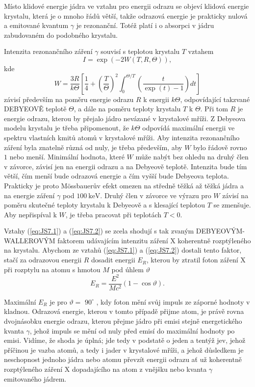 \documentclass[../../main.tex]{subfiles}
\begin{document}
Místo klidové energie jádra ve vztahu pro energii odrazu se objeví klidová energie krystalu, která je o mnoho řádů větší, takže odrazová energie je prakticky nulová a emitované kvantum $\gamma$ je rezonanční. Totéž platí i o absorpci v jádru zabudovaném do podobného krystalu. 

Intenzita rezonančního záření $\gamma$ souvisí s teplotou krystalu $T$ vztahem 
\begin{equation}\label{eq:JS7.1}
I = \exp (-2W(T,R, \Theta)),
\end{equation}
kde 
\begin{equation}\label{eq:JS7.2}
W = \dfrac{3R}{k \Theta} \left[ \dfrac{1}{4} + \left( \dfrac{T}{\Theta} \right)^2 \int_{0}^{\Theta /T} \left( \dfrac{t}{\exp(t) - 1}\right) dt \right] 
\end{equation}
závisí především na poměru energie odrazu $R$ k energii $k \Theta$, odpovídající takzvané DEBYEOVĚ teplotě $\Theta$, a dále na poměru teploty krystalu $T$ k $\Theta$. Při tom $R$ je energie odrazu, kterou by přejalo jádro nevázané v krystalové mříži. Z Debyeova modelu krystalu je třeba připomenout, že $k \Theta $ odpovídá maximální energii ve spektru vlastních kmitů atomů v krystalové mříži. Aby intenzita rezonančního záření byla znatelně různá od nuly, je třeba především, aby $W$ bylo řádově rovno $1$ nebo menší. Minimální hodnota, které $W$ může nabýt bez ohledu na druhý člen v závorce, závisí jen na energii odrazu a na Debyeově
teplotě. Intenzita bude tím větší, čím menší bude odrazová energie a čím vyšší bude Debyeova teplota. Prakticky je proto Mössbauerův efekt omezen na středně těžká až těžká jádra a na energie záření $\gamma$ pod $100 ~\mathrm{keV}$. Druhý člen v závorce ve výrazu pro $W$ závisí na poměru skutečné teploty krystalu k Debyeově a s klesající teplotou $T$ se zmenšuje. Aby nepřispíval k $W$, je třeba pracovat při teplotách $T < 0$.

Vztahy (\ref{eq:JS7.1}) a (\ref{eq:JS7.2}) se zcela shodují s tak zvaným DEBYEOVÝM-WALLEROVÝM faktorem udávajícím intenzitu záření X koherentně rozptýleného na krystalu. Abychom ze vztahů (\ref{eq:JS7.1}) a (\ref{eq:JS7.2}) dostali tento faktor, stačí za odrazovou energii $R$ dosadit energii $E_R$, kterou by ztratil foton záření X při rozptylu na atomu s hmotou $M$ pod úhlem $\vartheta$
\begin{equation}
E_R = \dfrac{E^2}{Mc^2} (1 - \cos \vartheta).
\end{equation}

Maximální $E_R$ je pro $\vartheta =$ $90^{\circ}$ , kdy foton mění svůj impuls ze záporné hodnoty v kladnou. Odrazová energie, kterou v tomto případě přijme atom, je právě rovna dvojnásobku energie odrazu, kterou přejme jádro při emisi stejně energetického kvanta $\gamma$, jehož impuls se mění od nuly před emisí do maximální hodnoty po emisi. Vidíme, že shoda je úplná; jde tedy v podstatě o jeden a tentýž jev, jehož příčinou je vazba atomů, a tedy i jader v krystalové mříži, a jehož důsledkem je neschopnost jednoho jádra nebo atomu převzít energii odrazu ať už koherentně rozptýleného záření X dopadajícího na atom z vnějšku nebo kvanta $\gamma$ emitovaného jádrem.
\end{document}

